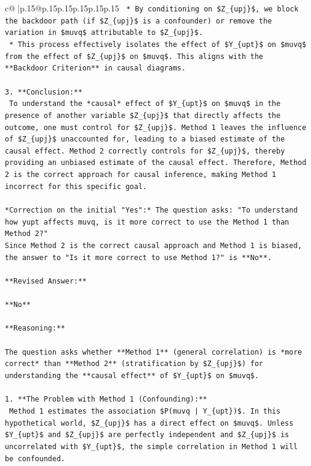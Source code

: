 \documentclass{article}
\begin{document}
{\begin{supertabular}{c@{$\;$}|p{.15\linewidth}@{}p{.15\linewidth}p{.15\linewidth}p{.15\linewidth}p{.15\linewidth}p{.15\linewidth}}
{{{\texttt{    *   By conditioning on \$Z\_\{upj\}\$, we block the backdoor path (if \$Z\_\{upj\}\$ is a confounder) or remove the variation in \$muvq\$ attributable to \$Z\_\{upj\}\$.} \\
\texttt{    *   This process effectively isolates the effect of \$Y\_\{upt\}\$ on \$muvq\$ from the effect of \$Z\_\{upj\}\$ on \$muvq\$. This aligns with the **Backdoor Criterion** in causal diagrams.} \\
\\ 
\texttt{3.  **Conclusion:**} \\
\texttt{    To understand the *causal* effect of \$Y\_\{upt\}\$ on \$muvq\$ in the presence of another variable \$Z\_\{upj\}\$ that directly affects the outcome, one must control for \$Z\_\{upj\}\$. Method 1 leaves the influence of \$Z\_\{upj\}\$ unaccounted for, leading to a biased estimate of the causal effect. Method 2 correctly controls for \$Z\_\{upj\}\$, thereby providing an unbiased estimate of the causal effect. Therefore, Method 2 is the correct approach for causal inference, making Method 1 incorrect for this specific goal.} \\
\\ 
\texttt{*Correction on the initial "Yes":* The question asks: "To understand how yupt affects muvq, is it more correct to use the Method 1 than Method 2?"} \\
\texttt{Since Method 2 is the correct causal approach and Method 1 is biased, the answer to "Is it more correct to use Method 1?" is **No**.} \\
\\ 
\texttt{**Revised Answer:**} \\
\\ 
\texttt{**No**} \\
\\ 
\texttt{**Reasoning:**} \\
\\ 
\texttt{The question asks whether **Method 1** (general correlation) is *more correct* than **Method 2** (stratification by \$Z\_\{upj\}\$) for understanding the **causal effect** of \$Y\_\{upt\}\$ on \$muvq\$.} \\
\\ 
\texttt{1.  **The Problem with Method 1 (Confounding):**} \\
\texttt{    Method 1 estimates the association \$P(muvq | Y\_\{upt\})\$. In this hypothetical world, \$Z\_\{upj\}\$ has a direct effect on \$muvq\$. Unless \$Y\_\{upt\}\$ and \$Z\_\{upj\}\$ are perfectly independent and \$Z\_\{upj\}\$ is uncorrelated with \$Y\_\{upt\}\$, the simple correlation in Method 1 will be confounded.} \\
}}}
\end{supertabular}}
\end{document}
